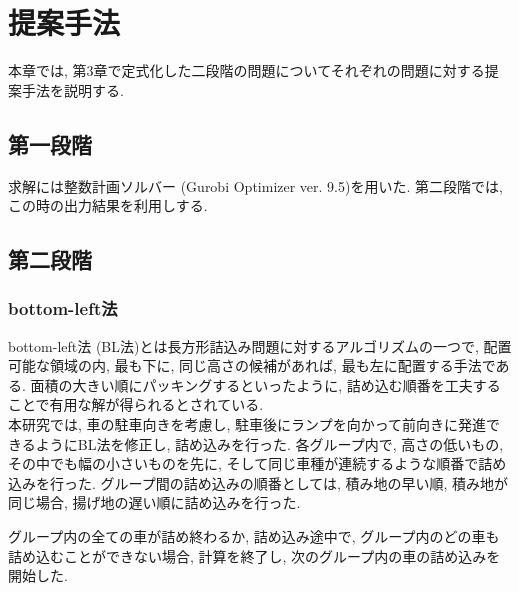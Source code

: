 \chapter{提案手法}\label{method}
本章では, 第3章で定式化した二段階の問題についてそれぞれの問題に対する提案手法を説明する. 

\section{第一段階}
求解には整数計画ソルバー (Gurobi Optimizer ver. 9.5)を用いた. 
第二段階では, この時の出力結果を利用しする.  

\section{第二段階}
\subsection*{bottom-left法}
bottom-left法 (BL法)とは長方形詰込み問題に対するアルゴリズムの一つで, 配置可能な領域の内, 最も下に, 同じ高さの候補があれば, 最も左に配置する手法である\cite{nfp2}. 
面積の大きい順にパッキングするといったように, 詰め込む順番を工夫することで有用な解が得られるとされている. \\


本研究では, 車の駐車向きを考慮し, 駐車後にランプを向かって前向きに発進できるようにBL法を修正し, 詰め込みを行った. 
各グループ内で, 高さの低いもの, その中でも幅の小さいものを先に, そして同じ車種が連続するような順番で詰め込みを行った. 
グループ間の詰め込みの順番としては, 積み地の早い順, 積み地が同じ場合, 揚げ地の遅い順に詰め込みを行った. 

グループ内の全ての車が詰め終わるか, 詰め込み途中で, グループ内のどの車も詰め込むことができない場合, 計算を終了し, 次のグループ内の車の詰め込みを開始した. 
